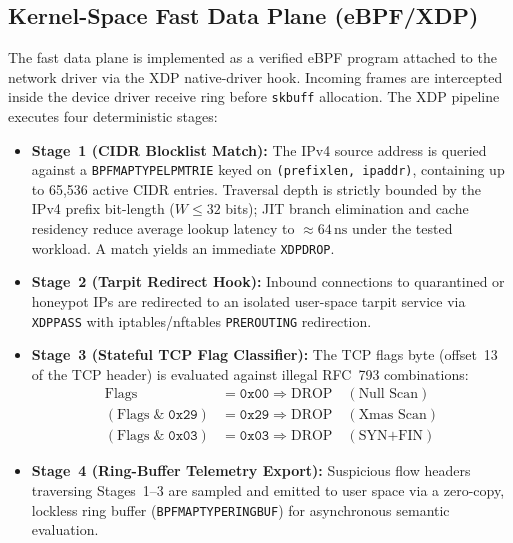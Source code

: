 \documentclass{ieeeaccess}
\renewcommand{\_}{\textunderscore\allowbreak}
\begin{document}
\subsection{Kernel-Space Fast Data Plane (eBPF/XDP)}
The fast data plane is implemented as a verified eBPF program attached to the
network driver via the XDP native-driver hook. Incoming frames are intercepted
inside the device driver receive ring before \texttt{sk\_buff} allocation. The
XDP pipeline executes four deterministic stages:
\begin{itemize}
  \item \textbf{Stage~1 (CIDR Blocklist Match):} The IPv4 source address is
    queried against a \texttt{BPF\_MAP\_TYPE\_LPM\_TRIE} keyed on
    \texttt{(prefix\_len, ip\_addr)}, containing up to 65{,}536 active CIDR
    entries. Traversal depth is strictly bounded by the IPv4 prefix bit-length
    ($W \le 32$ bits); JIT branch elimination and cache residency reduce average
    lookup latency to ${\approx}64\,\text{ns}$ under the tested workload. A match
    yields an immediate \texttt{XDP\_DROP}.

  \item \textbf{Stage~2 (Tarpit Redirect Hook):} Inbound connections to
    quarantined or honeypot IPs are redirected to an isolated user-space tarpit
    service via \texttt{XDP\_PASS} with iptables/nftables \texttt{PREROUTING}
    redirection.

  \item \textbf{Stage~3 (Stateful TCP Flag Classifier):} The TCP flags byte
    (offset~13 of the TCP header) is evaluated against illegal RFC~793 combinations:
    \begin{align}
      \text{Flags} &= \mathtt{0x00} \Rightarrow \text{DROP} \quad (\text{Null Scan}) \\
      (\text{Flags} \;\&\; \mathtt{0x29}) &= \mathtt{0x29} \Rightarrow \text{DROP} \quad (\text{Xmas Scan}) \\
      (\text{Flags} \;\&\; \mathtt{0x03}) &= \mathtt{0x03} \Rightarrow \text{DROP} \quad (\text{SYN+FIN})
    \end{align}

  \item \textbf{Stage~4 (Ring-Buffer Telemetry Export):} Suspicious flow headers
    traversing Stages~1--3 are sampled and emitted to user space via a zero-copy,
    lockless ring buffer (\texttt{BPF\_MAP\_TYPE\_RINGBUF}) for asynchronous
    semantic evaluation.
\end{itemize}
\end{document}
